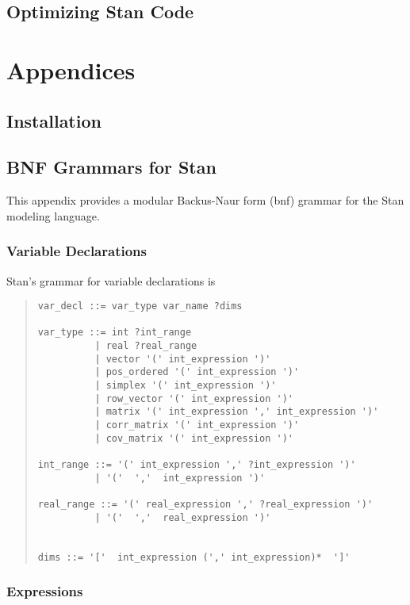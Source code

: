 \documentclass[10pt]{report}
\newcommand{\Stan}{Stan\xspace}
\newcommand{\acronym}[1]{{\sc #1}\xspace}
\newcommand{\BNF}{\acronym{bnf}}
\begin{document}
\chapter{Optimizing \Stan Code}\label{optimization.chapter}


\appendix

\part*{Appendices}


\chapter{Installation}\label{install.appendix}

\chapter{BNF Grammars for \Stan}

This appendix provides a modular Backus-Naur form (\BNF) grammar for
the Stan modeling language.

\section{Variable Declarations}

\Stan's grammar for variable declarations is
%
\begin{quote}
\begin{Verbatim}
var_decl ::= var_type var_name ?dims

var_type ::= int ?int_range
          | real ?real_range
          | vector '(' int_expression ')'
          | pos_ordered '(' int_expression ')'
          | simplex '(' int_expression ')'
          | row_vector '(' int_expression ')'
          | matrix '(' int_expression ',' int_expression ')'
          | corr_matrix '(' int_expression ')'
          | cov_matrix '(' int_expression ')'

int_range ::= '(' int_expression ',' ?int_expression ')'
          | '('  ','  int_expression ')'

real_range ::= '(' real_expression ',' ?real_expression ')'
          | '('  ','  real_expression ')'


dims ::= '['  int_expression (',' int_expression)*  ']'
\end{Verbatim}
\end{quote}

\section{Expressions}
\end{document}
